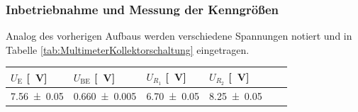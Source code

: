 \subsubsection*{Inbetriebnahme und Messung der Kenngrößen}
%
Analog des vorherigen Aufbaus werden verschiedene Spannungen notiert und in Tabelle \ref{tab:MultimeterKollektorschaltung} eingetragen.
%
\par
%
\minipage{\linewidth}
    \begin{center}
        \captionsetup{type=table}
        \begin{adjustbox}{max width=\linewidth, keepaspectratio}
            \begin{tabular}{llllll}
            \toprule
            $U_{\text{E}}$ [\SI{}{\volt}] & $U_{\text{BE}}$ [\SI{}{\volt}] & $U_{R_1}$ [\SI{}{\volt}] & $U_{R_2}$ [\SI{}{\volt}] \\
            \midrule
            \SI{7,56 \pm 0,05}{}          & \SI{0,660 \pm 0,005}{}         & \SI{6,70 \pm 0,05}{}     & \SI{8,25 \pm 0,05}{}     \\
            \bottomrule
            \end{tabular}
        \end{adjustbox}
        \label{tab:MultimeterKollektorschaltung}
    \end{center}
\endminipage
%
